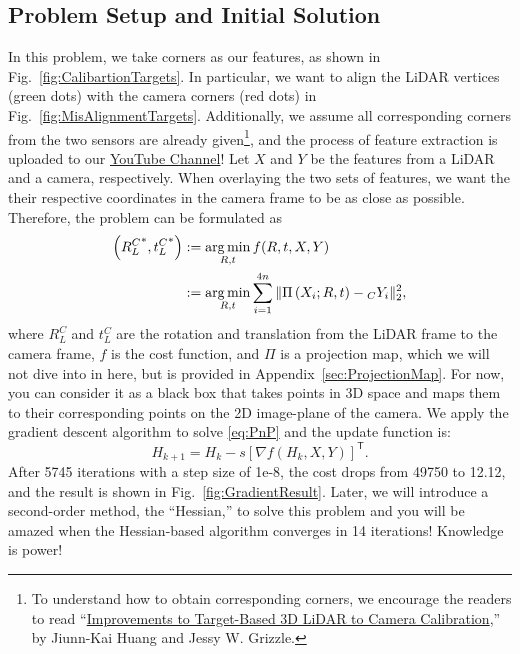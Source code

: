 \subsection{Problem Setup and Initial Solution}
In this problem, we take corners as our features, as shown in
Fig.~\ref{fig:CalibartionTargets}. In particular, we want to align the LiDAR
vertices (green dots) with the camera corners (red dots) in Fig.~\ref{fig:MisAlignmentTargets}. Additionally, we assume all corresponding corners
from the two sensors are already given\footnote{To
understand how to obtain corresponding corners, we encourage the readers to read
``\href{https://ieeexplore.ieee.org/document/9145571}{Improvements to Target-Based 3D
LiDAR to Camera Calibration},'' by Jiunn-Kai Huang and Jessy W. Grizzle.}, and the
process of feature extraction is uploaded to our
\href{https://www.youtube.com/watch?v=R2iMQt8tDhM}{YouTube
Channel}! Let $X$ and $Y$ be the features from a LiDAR and a camera, respectively. When
overlaying the two sets of features, we want the their respective coordinates in the camera frame to be as close as
possible. Therefore, the problem can be formulated as 
\begin{equation}
\label{eq:PnP}
\begin{aligned}
    \left({R_L^C}^*, {t_L^C}^*\right) &:=  \operatorname*{arg\,min}_{R,t}f(R,t,X,Y) \\&
    := \operatorname*{arg\,min}_{R, t}\sum_{i=1}^{4n}\|\Pi\left(X_i; R, t\right)-{}_{C}Y_i\|_2^2,
\end{aligned}
\end{equation}
where $R_L^C$ and $t_L^C$ are the rotation and translation from the LiDAR frame to the camera frame, $f$ is the cost function, and $\Pi$ is a projection map, which we will not dive
into in here, but is provided in Appendix~\ref{sec:ProjectionMap}. For now, you can
consider it as a black box that takes points in 3D space and maps them to their corresponding points on the 2D image-plane of the camera. We apply the gradient descent algorithm to solve
\eqref{eq:PnP} and the update function is:
\begin{equation}
    \label{eq:Gradient}
    H_{k+1}  = H_k - s[\nabla f(H_k, X, Y)]^\mathsf{T}.
\end{equation}
After 5745 iterations with a step size of 1e-8, the cost drops from 49750 to
12.12, and the result is shown in Fig.~\ref{fig:GradientResult}. Later, we will
introduce a second-order method, the ``Hessian,'' to solve this problem and you
will be amazed when the Hessian-based algorithm converges in 14 iterations! Knowledge is power! \\

